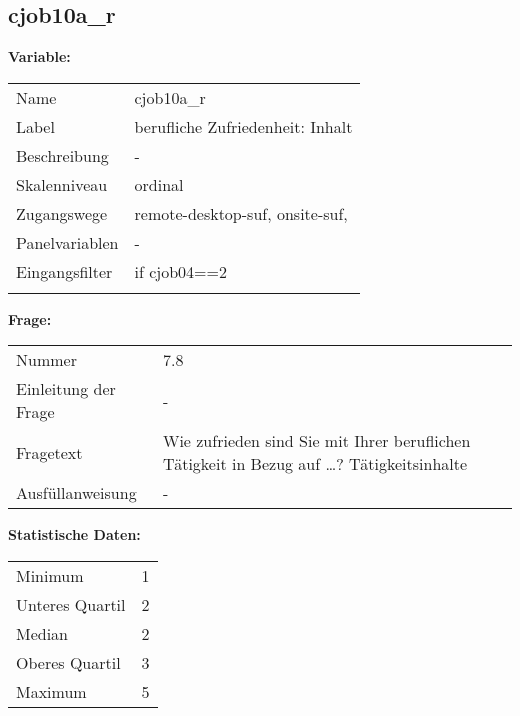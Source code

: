 	
	
	\subsection{cjob10a\_r}
	\label{subSection:cjob10a_r}

	\noindent\textbf{Variable:}\\
		\begin{tabular}{lL{11.3cm}}
			\label{tableVariable:cjob10a_r}
			Name & cjob10a\_r \\
			Label & berufliche Zufriedenheit: Inhalt \\
			Beschreibung & - \\
			Skalenniveau & ordinal \\
			Zugangswege &
				remote-desktop-suf,
				onsite-suf,
 \\
			Panelvariablen & -
			 \\
			Eingangsfilter & if cjob04==2 \\
 \\
		\end{tabular}

		\vspace*{1 cm}
		\noindent\textbf{Frage:}\\
		\begin{tabular}{lL{11.3cm}}
			\label{tableQuestion:cjob10a_r}
			Nummer & 7.8 \\
			Einleitung der Frage & - \\
			Fragetext & Wie zufrieden sind Sie mit Ihrer beruflichen Tätigkeit in Bezug auf …?
Tätigkeitsinhalte \\
			Ausfüllanweisung & - \\
		\end{tabular}


		\vspace*{1 cm}
		\noindent\textbf{Statistische Daten:}\\
			\begin{tabular}{ll}
				\label{tableStatistics:cjob10a_r}
					Minimum & 1 \\
					Unteres Quartil & 2 \\
					Median & 2 \\
					Oberes Quartil & 3 \\
					Maximum & 5 \\
			\end{tabular}



